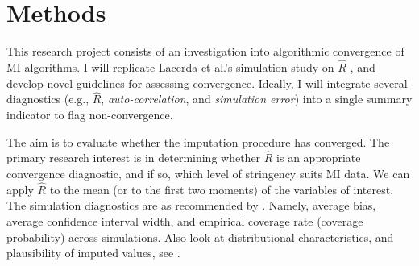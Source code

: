 \documentclass[article]{jss}
\begin{document}
% 
% 
% 
% 




\section{Methods} \label{sec:methods}

This research project consists of an investigation into algorithmic convergence of MI algorithms. I will replicate Lacerda et al.'s simulation study on $\widehat{R}$ \citep{lace07}, and develop novel guidelines for assessing convergence. Ideally, I will integrate several diagnostics (e.g., $\widehat{R}$, \emph{auto-correlation}, and \emph{simulation error}) into a single summary indicator to flag non-convergence. 

The aim is to evaluate whether the imputation procedure has converged. The primary research interest is in determining whether $\widehat{R}$ is an appropriate convergence diagnostic, and if so, which level of stringency suits MI data. We can apply $\widehat{R}$ to the mean (or to the first two moments) of the variables of interest. The simulation diagnostics are as recommended by \cite{buur18}. Namely, average bias, average confidence interval width, and empirical coverage rate (coverage probability) across simulations. %
Also look at distributional characteristics, and plausibility of imputed values, see \cite{vinknd}. %

\end{document}
